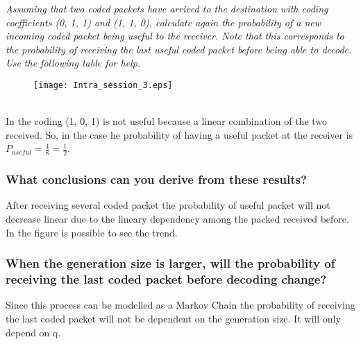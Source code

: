 \textit{Assuming that two coded packets have arrived to the destination with coding coefficients (0, 1, 1) and (1, 1, 0), calculate again the probability of a new incoming coded packet being useful to the receiver. Note that this corresponds to the probability of receiving the last useful coded packet before being able to decode. Use the following table for help.}\\
\begin{figure}[!h]
  \centering
  \texttt{[image: Intra\_session\_3.eps]}
  \caption{}
  \label{fig:Intra_session_3}
\end{figure}\\

In  the coding (1, 0, 1) is not useful because a linear combination of the two received. So, in the case he probability of having a useful packet at the receiver is $P_{useful}=\frac{4}{8}=\frac{1}{2}$.\\
\newpage
\subsubsection{What conclusions can you derive from these results?}
After receiving several coded packet the probability of useful packet will not decrease linear due to the lineary dependency among the packed received before. In the figure is possible to see the trend.

\subsubsection{When the generation size is larger, will the probability of receiving the last coded packet before decoding change?}

Since this process can be modelled as a Markov Chain the probability of receiving the last coded packet will not be dependent on the generation size. It will only depend on q.

